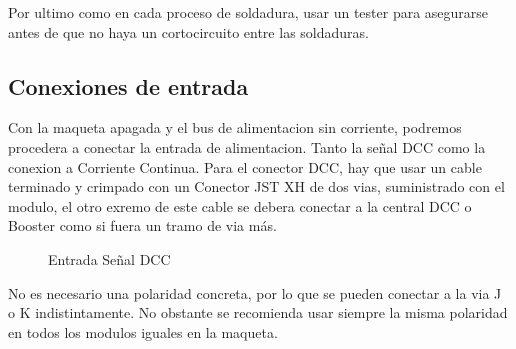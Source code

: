 Por ultimo como en cada proceso de soldadura, usar un tester para asegurarse antes de que no haya un cortocircuito
entre las soldaduras.
\subsection{Conexiones de entrada}
Con la maqueta apagada y el bus de alimentacion sin corriente, podremos procedera a conectar la entrada de alimentacion.
Tanto la señal DCC como la conexion a Corriente Continua. Para el conector DCC, hay que usar un cable terminado y 
crimpado con un Conector JST XH de dos vias, suministrado con el modulo, el otro exremo de este cable se debera conectar
a la central DCC o Booster como si fuera un tramo de via más.

\begin{figure}[H]
    \centering
    \caption{Entrada Señal DCC}
    \label{fig:DccIn}
\end{figure}
No es necesario una polaridad concreta, por lo que se pueden conectar a la via J o K indistintamente. No obstante se 
recomienda usar siempre la misma polaridad en todos los modulos iguales en la maqueta.

